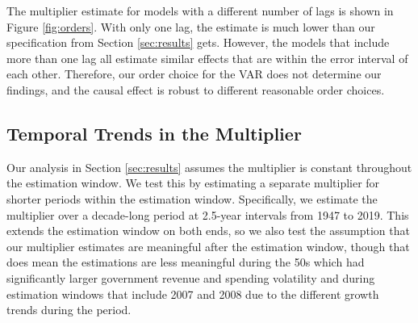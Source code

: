 The multiplier estimate for models with a different number of lags is shown in Figure \ref{fig:orders}. With only one lag, the estimate is much lower than our specification from Section \ref{sec:results} gets. However, the models that include more than one lag all estimate similar effects that are within the error interval of each other. Therefore, our order choice for the VAR does not determine our findings, and the causal effect is robust to different reasonable order choices.


\subsection{Temporal Trends in the Multiplier}

Our analysis in Section \ref{sec:results} assumes the multiplier is constant throughout the estimation window. We test this by estimating a separate multiplier for shorter periods within the estimation window. Specifically, we estimate the multiplier over a decade-long period at 2.5-year intervals from 1947 to 2019. This extends the estimation window on both ends, so we also test the assumption that our multiplier estimates are meaningful after the estimation window, though that does mean the estimations are less meaningful during the 50s which had significantly larger government revenue and spending volatility and during estimation windows that include 2007 and 2008 due to the different growth trends during the period.

